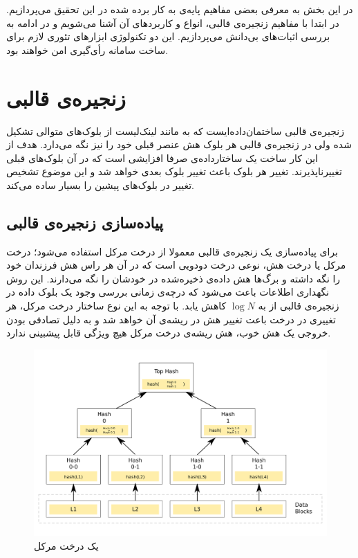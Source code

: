 در این بخش به معرفی بعضی مفاهیم پایه‌ی به کار برده شده در این تحقیق می‌پردازیم. در ابتدا با مفاهیم زنجیره‌ی قالبی، انواع و کاربرد‌های آن آشنا می‌شویم و در ادامه به بررسی اثبات‌های بی‌دانش می‌پردازیم. این دو تکنولوژی ابزارهای تئوری لازم برای ساخت سامانه رأی‌گیری امن خواهند بود.
\section{زنجیره‌ی قالبی}
زنجیره‌ی قالبی ساختمان‌داده‌ایست که به مانند لینک‌‌لیست
از بلوک‌‌های متوالی تشکیل شده ولی در زنجیره‌ی قالبی هر بلوک هش
عنصر قبلی خود را نیز نگه ‌می‌دارد. هدف از این کار ساخت یک ساختارداده‌ی صرفا افزایشی 
است که در آن‌ بلوک‌های قبلی تغییرناپذیرند. تغییر هر بلوک باعث تغییر بلوک بعدی خواهد شد و این موضوع تشخیص تغییر در بلوک‌های پیشین را بسیار ساده می‌کند.
\subsection{پیاده‌سازی زنجیره‌ی قالبی}


برای پیاده‌سازی یک زنجیره‌ی قالبی معمولا از درخت مرکل
 استفاده‌ می‌شود؛ درخت مرکل یا درخت هش، نوعی درخت دودویی 
 است که در آن هر راس هش فرزندان خود را نگه ‌داشته و برگ‌ها هش داده‌ی ذخیره‌شده در خودشان را نگه می‌دارند. این روش نگهداری اطلاعات باعث می‌شود که درچه‌ی زمانی بررسی وجود یک بلوک داده در زنجیره‌ی قالبی از 
 به 
$ \log N$
 کاهش یابد. با توجه به این نوع ساختار درخت مرکل، هر تغییری در درخت باعت تغییر هش در ریشه‌ی آن خواهد شد و به دلیل تصادفی بودن خروجی یک هش خوب، هش ریشه‌ی درخت مرکل هیچ ویژگی قابل پیشبینی ندارد.
 
 \begin{figure}[th!]
 	\centering
 	\includegraphics[width=.7\linewidth]{Hash_Tree.png}
 	\caption {یک درخت مرکل}
 	\label{fig:merkle}
 \end{figure}
 
